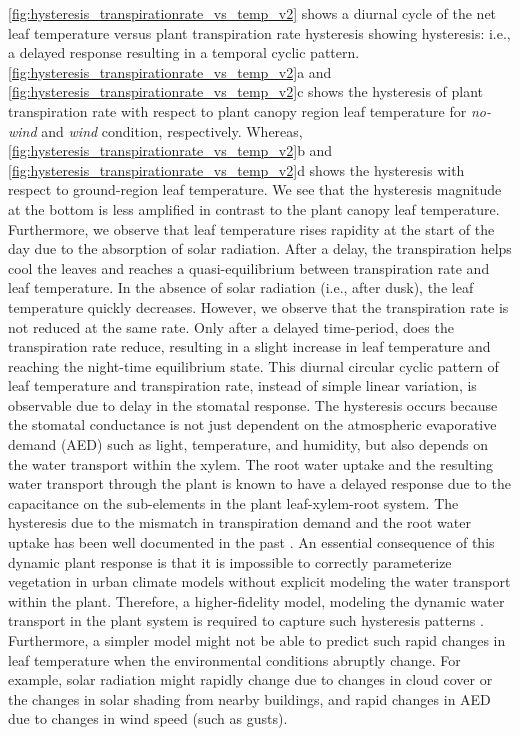 \cref{fig:hysteresis_transpirationrate_vs_temp_v2} shows a diurnal cycle of the net leaf temperature versus plant transpiration rate hysteresis showing hysteresis: i.e., a delayed response resulting in a temporal cyclic pattern. \cref{fig:hysteresis_transpirationrate_vs_temp_v2}a and \cref{fig:hysteresis_transpirationrate_vs_temp_v2}c shows the hysteresis of plant transpiration rate with respect to plant canopy region leaf temperature for \textit{no-wind} and \textit{wind} condition, respectively. Whereas, \cref{fig:hysteresis_transpirationrate_vs_temp_v2}b and \cref{fig:hysteresis_transpirationrate_vs_temp_v2}d shows the hysteresis with respect to ground-region leaf temperature. We see that the hysteresis magnitude at the bottom is less amplified in contrast to the plant canopy leaf temperature. Furthermore, we observe that leaf temperature rises rapidity at the start of the day due to the absorption of solar radiation. After a delay, the transpiration helps cool the leaves and reaches a quasi-equilibrium between transpiration rate and leaf temperature. In the absence of solar radiation (i.e., after dusk), the leaf temperature quickly decreases. However, we observe that the transpiration rate is not reduced at the same rate. Only after a delayed time-period, does the transpiration rate reduce, resulting in a slight increase in leaf temperature and reaching the night-time equilibrium state. This diurnal circular cyclic pattern of leaf temperature and transpiration rate, instead of simple linear variation, is observable due to delay in the stomatal response. The hysteresis occurs because the stomatal conductance is not just dependent on the atmospheric evaporative demand (AED) such as light, temperature, and humidity, but also depends on the water transport within the xylem. The root water uptake and the resulting water transport through the plant is known to have a delayed response due to the capacitance on the sub-elements in the plant leaf-xylem-root system. The hysteresis due to the mismatch in transpiration demand and the root water uptake has been well documented in the past \citep{Dauzat2001, Williams1996}. An essential consequence of this dynamic plant response is that it is impossible to correctly parameterize vegetation in urban climate models without explicit modeling the water transport within the plant. Therefore, a higher-fidelity model, modeling the dynamic water transport in the plant system is required to capture such hysteresis patterns \citep{Huang2017, Manzoni2011}. Furthermore, a simpler model might not be able to predict such rapid changes in leaf temperature when the environmental conditions abruptly change. For example, solar radiation might rapidly change due to changes in cloud cover or the changes in solar shading from nearby buildings, and rapid changes in AED due to changes in wind speed (such as gusts).     

